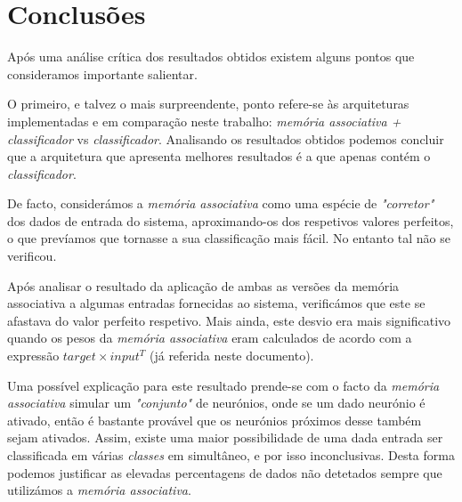 \documentclass{article}
\begin{document}
\pagebreak

\section{Conclusões}

Após uma análise crítica dos resultados obtidos existem alguns pontos que consideramos importante salientar.

O primeiro, e talvez o mais surpreendente, ponto refere-se às arquiteturas implementadas e em comparação neste trabalho: \emph{memória associativa + classificador} vs \emph{classificador}. Analisando os resultados obtidos podemos concluir que a arquitetura que apresenta melhores resultados é a que apenas contém o \emph{classificador}.

De facto, considerámos a \emph{memória associativa} como uma espécie de \emph{"corretor"} dos dados de entrada do sistema, aproximando-os dos respetivos valores perfeitos, o que prevíamos que tornasse a sua classificação mais fácil. No entanto tal não se verificou.

Após analisar o resultado da aplicação de ambas as versões da memória associativa a algumas entradas fornecidas ao sistema, verificámos que este se afastava do valor perfeito respetivo. Mais ainda, este desvio era mais significativo quando os pesos da \emph{memória associativa} eram calculados de acordo com a expressão $target\times input^T$ (já referida neste documento).

Uma possível explicação para este resultado prende-se com o facto da \emph{memória associativa} simular um \emph{"conjunto"} de neurónios, onde se um dado neurónio é ativado, então é bastante provável que os neurónios próximos desse também sejam ativados. Assim, existe uma maior possibilidade de uma dada entrada ser classificada em várias \emph{classes} em simultâneo, e por isso inconclusivas. Desta forma podemos justificar as elevadas percentagens de dados não detetados sempre que utilizámos a \emph{memória associativa}.

\end{document}
